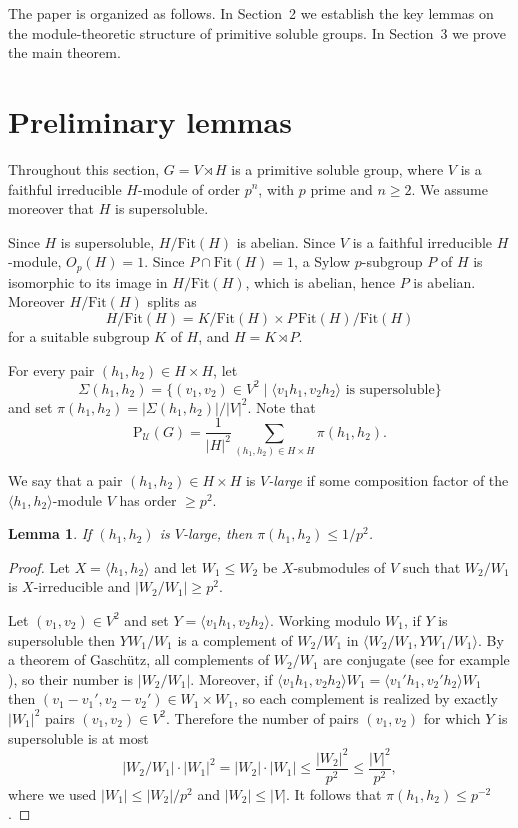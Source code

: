 \documentclass[10pt,a4paper]{amsart}
\newtheorem{lemma}{Lemma}
\newcommand{\Psu}{\mathrm{P}_{\mathcal{U}}}
\newcommand{\Fit}{\mathrm{Fit}}
\begin{document}
	The paper is organized as follows. In Section~2 we establish 
	the key lemmas on the module-theoretic structure of primitive 
	soluble groups. In Section~3 we prove the main theorem.
	
	\section{Preliminary lemmas}
	
	Throughout this section, $G = V \rtimes H$ is a primitive 
	soluble group, where $V$ is a faithful irreducible $H$-module 
	of order $p^n$, with $p$ prime and $n \geq 2$. We assume 
	moreover that $H$ is supersoluble.
	
	Since $H$ is supersoluble, $H/\Fit(H)$ is abelian. Since $V$ 
	is a faithful irreducible $H$-module, $O_p(H)=1$. Since 
	$P \cap \Fit(H) = 1$, a Sylow $p$-subgroup $P$ of $H$ is 
	isomorphic to its image in $H/\Fit(H)$, which is abelian, 
	hence $P$ is abelian. Moreover $H/\Fit(H)$ splits as
	$$H/\Fit(H) = K/\Fit(H) \times P\,\Fit(H)/\Fit(H)$$
	for a suitable subgroup $K$ of $H$, and $H = K \rtimes P$.
	
	For every pair $(h_1,h_2) \in H \times H$, let
	$$\Sigma(h_1,h_2) = \{(v_1,v_2)\in V^2 \mid 
	\langle v_1h_1, v_2h_2\rangle \text{ is supersoluble}\}$$
	and set $\pi(h_1,h_2) = |\Sigma(h_1,h_2)|/|V|^2$. Note that
	$$\Psu(G) = \frac{1}{|H|^2} \sum_{(h_1,h_2) \in H \times H} 
	\pi(h_1,h_2).$$
	
	We say that a pair $(h_1,h_2) \in H \times H$ is 
	\textit{$V$-large} if some composition factor of the 
	$\langle h_1,h_2\rangle$-module $V$ has order $\geq p^2$.
	
	\begin{lemma}\label{lem:large}
		If $(h_1,h_2)$ is $V$-large, then $\pi(h_1,h_2) \leq 1/p^2$.
	\end{lemma}
	\begin{proof}
		Let $X = \langle h_1,h_2\rangle$ and let $W_1 \leq W_2$ be 
		$X$-submodules of $V$ such that $W_2/W_1$ is $X$-irreducible 
		and $|W_2/W_1| \geq p^2$.
		
		Let $(v_1,v_2) \in V^2$ and set 
		$Y = \langle v_1h_1, v_2h_2\rangle$. Working modulo $W_1$, 
		if $Y$ is supersoluble then $YW_1/W_1$ is a complement of 
		$W_2/W_1$ in $\langle W_2/W_1, YW_1/W_1\rangle$. By a theorem 
		of Gasch\"{u}tz, all complements of $W_2/W_1$ are conjugate (see for example \cite[Propositon 1.6.8]{dh}), 
		so their number is $|W_2/W_1|$. Moreover, if 
		$\langle v_1h_1, v_2h_2\rangle W_1 = 
		\langle v_1'h_1, v_2'h_2\rangle W_1$ then 
		$(v_1-v_1', v_2-v_2') \in W_1 \times W_1$, so each complement 
		is realized by exactly $|W_1|^2$ pairs $(v_1,v_2) \in V^2$. 
		Therefore the number of pairs $(v_1,v_2)$ for which $Y$ is 
		supersoluble is at most 
		$$|W_2/W_1| \cdot |W_1|^2 = |W_2| \cdot |W_1| \leq 
		\frac{|W_2|^2}{p^2} \leq \frac{|V|^2}{p^2},$$
		where we used $|W_1| \leq |W_2|/p^2$ and $|W_2| \leq |V|$. 
		It follows that $\pi(h_1,h_2) \leq p^{-2}$.
	\end{proof}
	
\end{document}
